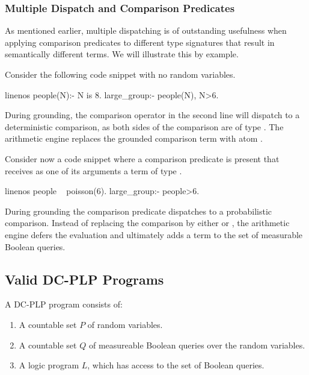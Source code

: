 \subsubsection*{Multiple Dispatch and Comparison Predicates}

As mentioned earlier, multiple dispatching is of outstanding usefulness when applying comparison predicates to different type signatures that result in semantically different terms. We will illustrate this by example.

\begin{example} Consider the following \dcproblogsty code snippet with no random variables.
	\begin{problog*}{linenos}
people(N):- N is 8.
large_group:- people(N), N>6.
	\end{problog*}
	During grounding, the comparison operator in the second line will dispatch to a deterministic comparison, as both sides of the comparison are of type . The arithmetic engine replaces the grounded comparison term with atom .
\end{example}

\begin{example} Consider now  a \dcproblogsty code snippet where a comparison predicate is present that receives as one of its arguments a term of type .
	\begin{problog*}{linenos}
people ~ poisson(6).
large_group:- people>6.
	\end{problog*}
	During grounding the comparison predicate dispatches to a probabilistic comparison. Instead of replacing the comparison by either  or , the arithmetic engine defers the evaluation and ultimately adds a  term to the set of measurable Boolean queries.
\end{example}

\subsection{Valid DC-PLP Programs}


\begin{definition}
	A DC-PLP program \dcpprogram consists of:
	\begin{enumerate}
		\item A countable set $P$ of random variables.
		\item A countable set $Q$ of measureable Boolean queries over the random variables.
		\item A logic program $L$, which has access to the set of Boolean queries.
	\end{enumerate}
\end{definition}

